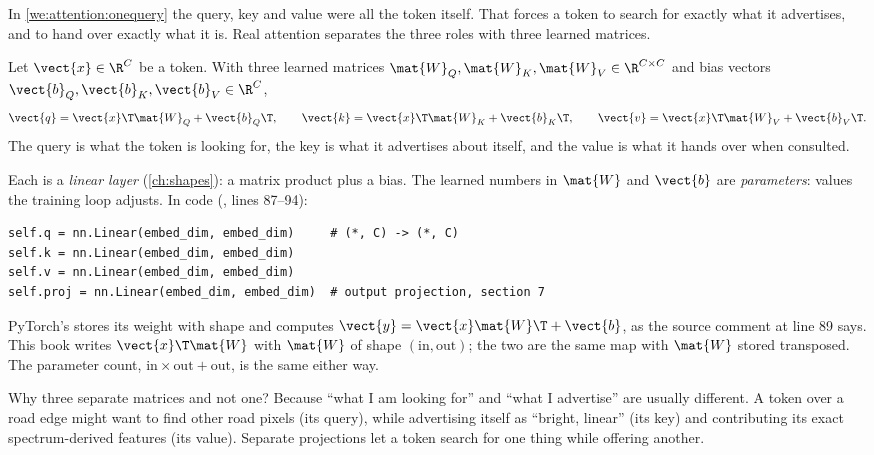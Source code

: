 In \cref{we:attention:onequery} the query, key and value were all the token itself. That forces
a token to search for exactly what it advertises, and to hand over exactly what it is. Real
attention separates the three roles with three learned matrices.

\begin{definition}
Let $\vect{x}\in\R^{C}$ be a token. With three learned matrices
$\mat{W}_Q, \mat{W}_K, \mat{W}_V \in \R^{C\times C}$ and bias vectors
$\vect{b}_Q, \vect{b}_K, \vect{b}_V\in\R^{C}$,
\begin{align}
  \vect{q} = \vect{x}\T\mat{W}_Q + \vect{b}_Q\T,\qquad
  \vect{k} = \vect{x}\T\mat{W}_K + \vect{b}_K\T,\qquad
  \vect{v} = \vect{x}\T\mat{W}_V + \vect{b}_V\T .
\end{align}
The query is what the token is looking for, the key is what it
advertises about itself, and the value is what it hands over when consulted.
\end{definition}

Each is a \emph{linear layer} (\cref{ch:shapes}): a matrix product plus a
bias. The learned numbers in $\mat{W}$ and $\vect{b}$ are \emph{parameters}: values the training
loop adjusts. In code (,
lines 87--94):
\begin{lstlisting}
self.q = nn.Linear(embed_dim, embed_dim)     # (*, C) -> (*, C)
self.k = nn.Linear(embed_dim, embed_dim)
self.v = nn.Linear(embed_dim, embed_dim)
self.proj = nn.Linear(embed_dim, embed_dim)  # output projection, section 7
\end{lstlisting}
\begin{sourcenote}
PyTorch's  stores its weight with shape  and computes
$\vect{y} = \vect{x}\mat{W}\T + \vect{b}$, as the source comment at
 line 89 says. This book writes $\vect{x}\T\mat{W}$ with
$\mat{W}$ of shape $(\text{in}, \text{out})$; the two are the same map with $\mat{W}$ stored
transposed. The parameter count, $\text{in}\times\text{out} + \text{out}$, is the same either way.
\end{sourcenote}

Why three separate matrices and not one? Because ``what I am looking for'' and ``what I
advertise'' are usually different. A token over a road edge might want to find other road
pixels (its query), while advertising itself as ``bright, linear'' (its key) and contributing
its exact spectrum-derived features (its value). Separate projections let a token search for one
thing while offering another.

